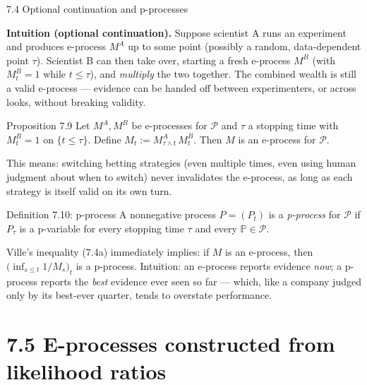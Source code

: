 \documentclass[aspectratio=169,10pt]{beamer}
\begin{document}
\begin{frame}[allowframebreaks]{7.4 Optional continuation and p-processes}

\textbf{Intuition (optional continuation).} Suppose scientist A runs an experiment and produces e-process
$M^A$ up to some point (possibly a random, data-dependent point $\tau$). Scientist B can then take over,
starting a fresh e-process $M^B$ (with $M^B_t = 1$ while $t \le \tau$), and \emph{multiply} the two together. The
combined wealth is still a valid e-process --- evidence can be handed off between experimenters, or across looks,
without breaking validity.

\begin{block}{Proposition 7.9}
Let $M^A, M^B$ be e-processes for $\mathcal P$ and $\tau$ a stopping time with $M_t^B = 1$ on $\{t \le \tau\}$.
Define $M_t := M^A_{\tau\wedge t}\, M^B_t$. Then $M$ is an e-process for $\mathcal P$.
\end{block}

This means: switching betting strategies (even multiple times, even using human judgment about when to switch)
never invalidates the e-process, as long as each strategy is itself valid on its own turn.

\framebreak

\begin{block}{Definition 7.10: p-process}
A nonnegative process $P=(P_t)$ is a \emph{p-process} for $\mathcal P$ if $P_\tau$ is a p-variable for every
stopping time $\tau$ and every $\mathbb P \in \mathcal P$.
\end{block}

Ville's inequality (7.4a) immediately implies: if $M$ is an e-process, then $\big(\inf_{s\le t} 1/M_s\big)_{t}$ is a
p-process. Intuition: an e-process reports evidence \emph{now}; a p-process reports the \emph{best} evidence ever
seen so far --- which, like a company judged only by its best-ever quarter, tends to overstate performance.

\end{frame}

\section{7.5 E-processes constructed from likelihood ratios}
\end{document}
